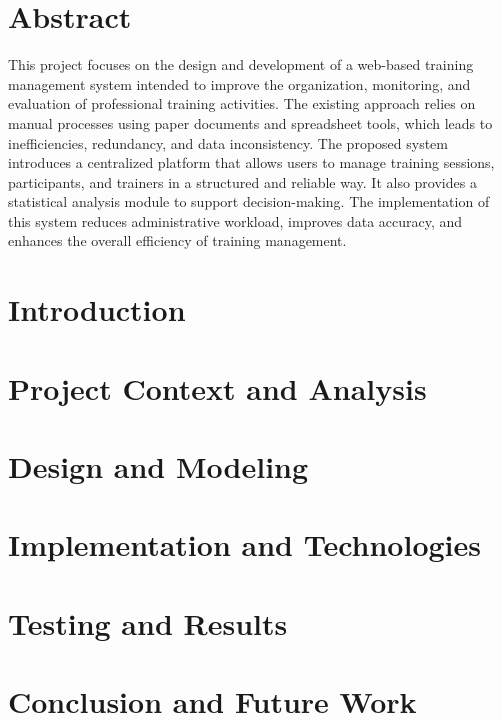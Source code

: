 \documentclass[12pt,a4paper]{report}
\begin{document}
\chapter*{Abstract}
This project focuses on the design and development of a web-based training management system intended to improve the organization, monitoring, and evaluation of professional training activities. The existing approach relies on manual processes using paper documents and spreadsheet tools, which leads to inefficiencies, redundancy, and data inconsistency. The proposed system introduces a centralized platform that allows users to manage training sessions, participants, and trainers in a structured and reliable way. It also provides a statistical analysis module to support decision-making. The implementation of this system reduces administrative workload, improves data accuracy, and enhances the overall efficiency of training management.

\tableofcontents

\chapter{Introduction}


\chapter{Project Context and Analysis}


\chapter{Design and Modeling}


\chapter{Implementation and Technologies}


\chapter{Testing and Results}


\chapter{Conclusion and Future Work}

\end{document}
